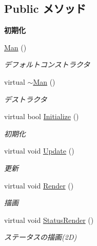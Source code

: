 \subsection*{Public メソッド}
\begin{Indent}{\bf 初期化}\par
\begin{DoxyCompactItemize}
\item 
\hyperlink{class_man_a051ab47a531f9b88d602d1ded39a12ce}{Man} ()
\begin{DoxyCompactList}\small\item\em デフォルトコンストラクタ \end{DoxyCompactList}\item 
virtual \hyperlink{class_man_aaaaf60a8e06cb3f81fd1cada9961e7fa}{$\sim$\-Man} ()
\begin{DoxyCompactList}\small\item\em デストラクタ \end{DoxyCompactList}\item 
virtual bool \hyperlink{class_man_a465c9e858a334083e663eb266dbbe0f2}{Initialize} ()
\begin{DoxyCompactList}\small\item\em 初期化 \end{DoxyCompactList}\item 
virtual void \hyperlink{class_man_aadef07ec563fbabf2afbd9ea15558c91}{Update} ()
\begin{DoxyCompactList}\small\item\em 更新 \end{DoxyCompactList}\item 
virtual void \hyperlink{class_man_a87a4883012aba35a3288212b0412df86}{Render} ()
\begin{DoxyCompactList}\small\item\em 描画 \end{DoxyCompactList}\item 
virtual void \hyperlink{class_man_ae4f1db4bc8c4294fe7ec94e7351959dc}{Status\-Render} ()
\begin{DoxyCompactList}\small\item\em ステータスの描画(2\-D) \end{DoxyCompactList}\end{DoxyCompactItemize}
\end{Indent}
